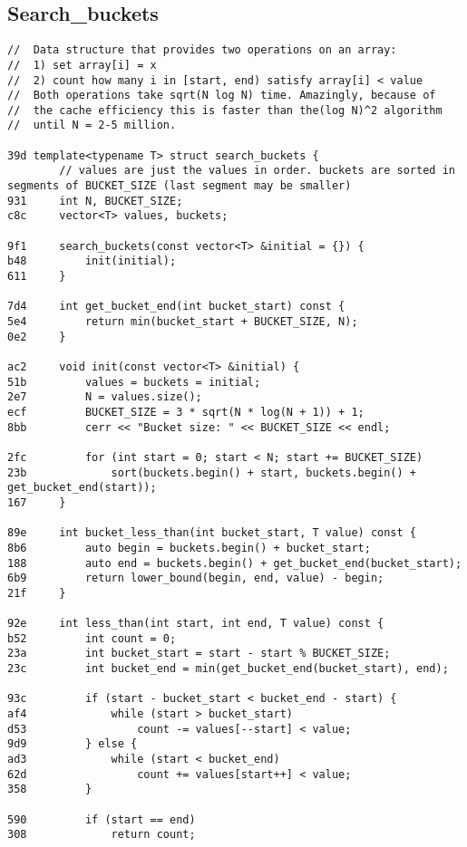 \documentclass[11pt, a4paper, twoside]{article}
\begin{document}
\subsection{ Search_buckets}
\begin{lstlisting}
//  Data structure that provides two operations on an array:
//  1) set array[i] = x
//  2) count how many i in [start, end) satisfy array[i] < value
//  Both operations take sqrt(N log N) time. Amazingly, because of 
//  the cache efficiency this is faster than the(log N)^2 algorithm 
//  until N = 2-5 million.

39d template<typename T> struct search_buckets {
        // values are just the values in order. buckets are sorted in segments of BUCKET_SIZE (last segment may be smaller)
931     int N, BUCKET_SIZE;
c8c     vector<T> values, buckets;
    
9f1     search_buckets(const vector<T> &initial = {}) {
b48         init(initial);
611     }
    
7d4     int get_bucket_end(int bucket_start) const {
5e4         return min(bucket_start + BUCKET_SIZE, N);
0e2     }
    
ac2     void init(const vector<T> &initial) {
51b         values = buckets = initial;
2e7         N = values.size();
ecf         BUCKET_SIZE = 3 * sqrt(N * log(N + 1)) + 1;
8bb         cerr << "Bucket size: " << BUCKET_SIZE << endl;
    
2fc         for (int start = 0; start < N; start += BUCKET_SIZE)
23b             sort(buckets.begin() + start, buckets.begin() + get_bucket_end(start));
167     }
    
89e     int bucket_less_than(int bucket_start, T value) const {
8b6         auto begin = buckets.begin() + bucket_start;
188         auto end = buckets.begin() + get_bucket_end(bucket_start);
6b9         return lower_bound(begin, end, value) - begin;
21f     }
    
92e     int less_than(int start, int end, T value) const {
b52         int count = 0;
23a         int bucket_start = start - start % BUCKET_SIZE;
23c         int bucket_end = min(get_bucket_end(bucket_start), end);
    
93c         if (start - bucket_start < bucket_end - start) {
af4             while (start > bucket_start)
d53                 count -= values[--start] < value;
9d9         } else {
ad3             while (start < bucket_end)
62d                 count += values[start++] < value;
358         }
    
590         if (start == end)
308             return count;
    

\end{lstlisting}
\end{document}
